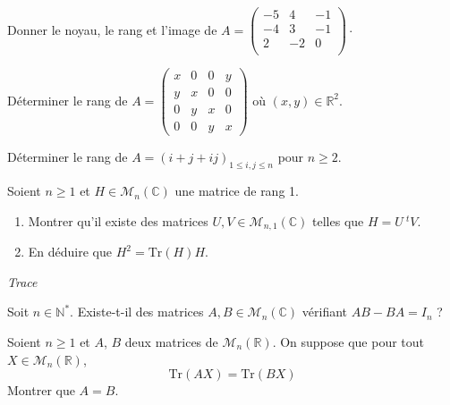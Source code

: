 \documentclass[a4paper,10pt]{report}
\begin{document}
\begin{Exa} Donner le noyau, le rang et l'image de $A = \begin{pmatrix}
-5 & 4 & -1 \\
-4 & 3 & - 1 \\
2 	 & -2 & 0 \\
\end{pmatrix}\cdot$
\end{Exa}

\begin{Exa} Déterminer le rang de $A = \begin{pmatrix}
x & 0 & 0& y \\
y & x & 0 & 0 \\
0 & y & x & 0 \\
0 & 0 & y & x
\end{pmatrix}$ où $(x,y) \in \mathbb{R}^2$.
\end{Exa} 

\begin{Exa} Déterminer le rang de $A=(i+j+ij)_{1\leq i,j\leq n}$ pour $n \geq 2$.
\end{Exa} 


\begin{Exa} Soient $n \geq 1$ et $H \in \mathcal{M}_n(\mathbb{C})$ une matrice de rang 1.
    \begin{enumerate}
      \item
        Montrer qu'il existe des matrices $U,V \in \mathcal{M}_{n,1}(\mathbb{C})$ telles que $H = U ~^tV$.
      \item En déduire que $H^2 = \textrm{Tr}(H)H$.
 \end{enumerate}
\end{Exa}
 \medskip

\begin{center}
\textit{{ {\large Trace}}}
\end{center}

\medskip


\begin{Exa} Soit $n \in \mathbb{N}^*$. Existe-t-il des matrices $A,B \in \mathcal{M}_n(\mathbb{C})$ vérifiant $AB - BA = I_n$ ?
\end{Exa}


\begin{Exa}[\ding{80}] Soient $n \geq 1$ et $A$, $B$ deux matrices de $\mathcal{M}_n(\mathbb{R})$. On suppose que pour tout $X \in \mathcal{M}_n(\mathbb{R})$, 
$$\textrm{Tr}(AX)= \textrm{Tr}(BX)$$
Montrer que $A=B$.
\end{Exa}
\end{document}
